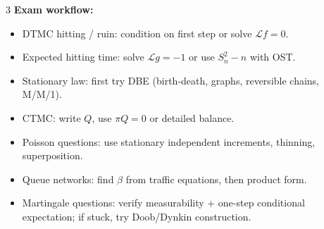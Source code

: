 \documentclass[8pt]{extarticle}
\newcommand{\1}{\mathbf{1}}
\begin{document}
\begin{multicols*}{3}
\textbf{Exam workflow:}
\begin{itemize}
\item DTMC hitting / ruin: condition on first step or solve $\mathcal L f=0$.
\item Expected hitting time: solve $\mathcal L g=-1$ or use $S_n^2-n$ with OST.
\item Stationary law: first try DBE (birth-death, graphs, reversible chains, M/M/1).
\item CTMC: write $Q$, use $\pi Q=0$ or detailed balance.
\item Poisson questions: use stationary independent increments, thinning, superposition.
\item Queue networks: find $\beta$ from traffic equations, then product form.
\item Martingale questions: verify measurability + one-step conditional expectation; if stuck, try Doob/Dynkin construction.
\end{itemize}


\end{multicols*}
\end{document}
